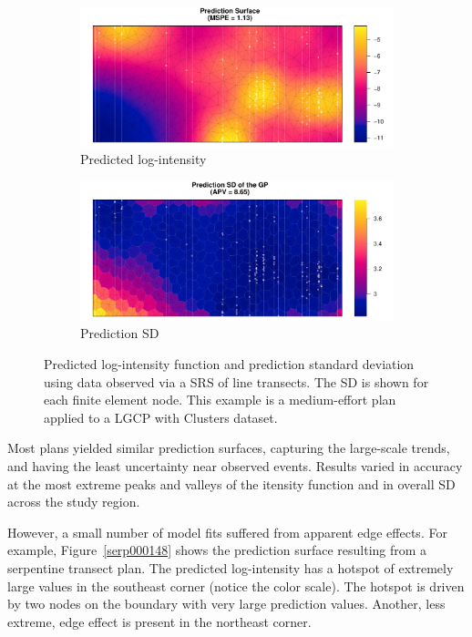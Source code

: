 \documentclass[review]{elsarticle}
\begin{document}
\begin{figure}

\begin{subfigure}{5in}
\includegraphics[width=5in]{../graphics/lambda-SRS000187-Cluster000004.pdf}
\caption{Predicted log-intensity}
\label{lambdasrs000187clust}
\end{subfigure}

\begin{subfigure}{5in}
\includegraphics[width=5in]{../graphics/lambdaSD-SRS000187-Cluster000004.pdf}
\caption{Prediction SD}
\label{sdsrs000187clust}
\end{subfigure}

\caption{Predicted log-intensity function and prediction standard deviation
using data observed via a SRS of line transects. The SD is shown for each
finite element node. This example is a medium-effort plan applied to a
LGCP with Clusters dataset.}
\label{srs000187clust}
\end{figure}

Most plans yielded similar prediction surfaces, capturing the large-scale
trends, and having the least uncertainty near observed events. Results varied
in accuracy at the most extreme peaks and valleys of the itensity function and
in overall SD across the study region.

However, a small number of model fits suffered from apparent edge effects.
For example, Figure~\ref{serp000148} shows the prediction surface resulting
from a serpentine transect plan. The predicted log-intensity has a hotspot of
extremely large values in the southeast corner (notice the color scale). The
hotspot is driven by two nodes on the boundary with very large prediction
values. Another, less extreme, edge effect is present in the northeast corner.
\end{document}
